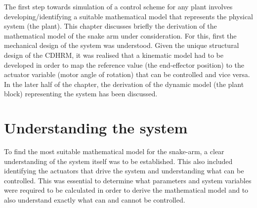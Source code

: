 \documentclass[a4paper,12pt]{report}
\begin{document}
The first step towards simulation of a control scheme for any plant involves developing/identifying a suitable mathematical model that represents the physical system (the plant). This chapter discusses briefly the derivation of the mathematical model of the snake arm under consideration. For this, first the mechanical design of the system was understood. Given the unique structural design of the CDHRM, it was realised that a kinematic model had to be developed in order to map the reference value (the end-effector position) to the actuator variable (motor angle of rotation) that can be controlled and vice versa. In the later half of the chapter, the derivation of the dynamic model (the plant block) representing the system has been discussed.

\section{Understanding the system}
To find the most suitable mathematical model for the snake-arm, a clear understanding of the system itself was to be established. This also included identifying the actuators that drive the system and understanding what can be controlled. This was essential to determine what parameters and system variables were required to be calculated in order to derive the mathematical model and to also understand exactly what can and cannot be controlled.
\end{document}
